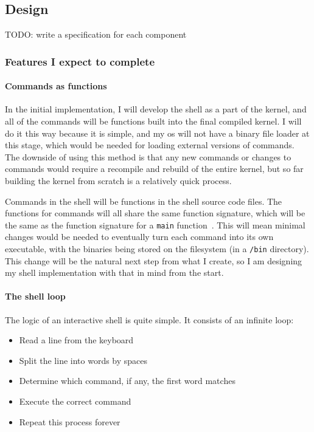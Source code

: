 \documentclass{article}
\begin{document}
\subsection{Design}

TODO: write a specification for each component
\subsubsection{Features I expect to complete}

\paragraph{Commands as functions}
In the initial implementation, I will develop the shell as a part of the
kernel, and all of the commands will be functions built into the final compiled
kernel. I will do it this way because it is simple, and my \gls{os} will not
have a binary file loader at this stage, which would be needed for loading
external versions of commands. The downside of using this method is that any
new commands or changes to commands would require a recompile and rebuild of
the entire kernel, but so far building the kernel from scratch is a relatively
quick process.

Commands in the shell will be functions in the shell source code files. The
functions for commands will all share the same function signature, which will
be the same as the function signature for a \texttt{main}
function~\cite{c-main-func}. This will mean minimal changes would be needed to
eventually turn each command into its own executable, with the binaries being
stored on the filesystem (in a \texttt{/bin} directory). This change will be
the natural next step from what I create, so I am designing my shell
implementation with that in mind from the start.

\paragraph{The shell loop}
The logic of an interactive shell is quite simple. It consists of an infinite
loop:

\begin{itemize}
    \item Read a line from the keyboard
    \item Split the line into words by spaces
    \item Determine which command, if any, the first word matches
    \item Execute the correct command
    \item Repeat this process forever
\end{itemize}
\end{document}
